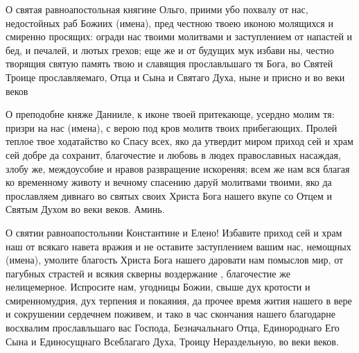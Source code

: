 \bigskip\bigskip\mychapterending

 


О святая равноапостольная княгине Ольго, приими убо похвалу от нас, недостойных раб Божиих (имена), пред  честною твоею иконою молящихся и смиренно просящих: огради нас твоими молитвами и заступлением от напастей и бед,  и печалей, и лютых грехов; еще же и от будущих мук избави ны, честно творящия святую память твою и славящия прославльшаго тя Бога, во Святей Троице прославляемаго, Отца и Сына и Святаго Духа, ныне и присно и во веки веков


\bigskip\bigskip\mychapterending

 


О преподобне княже Данииле, к иконе твоей притекающе, усердно молим тя: призри на нас (имена), с верою под  кров молитв твоих прибегающих.  Пролей теплое твое ходатайство ко Спасу всех,  яко да утвердит миром приход сей и храм сей добре да сохранит, благочестие и любовь в людех православных насаждая, злобу же, междоусобие и нравов развращение  искореняя; всем же нам вся благая ко временному животу и вечному спасению даруй молитвами твоими, яко да прославляем дивнаго во святых своих Христа Бога нашего вкупе со Отцем и Святым Духом во веки веков. Аминь.


\bigskip\bigskip\mychapterending

 


О святии равноапостольнии Константине и Елено! Избавите приход сей и храм наш от всякаго навета вражия и не оставите заступлением вашим нас, немощных (имена), умолите благость Христа Бога нашего даровати нам помыслов мир, от пагубных страстей и всякия скверны воздержание , благочестие же нелицемерное.  Испросите нам, угодницы Божии, свыше дух кротости и смиренномудрия, дух терпения и покаяния,  да прочее время жития нашего в вере и сокрушении сердечнем поживем, и тако в час скончания нашего благодарне восхвалим прославльшаго вас Господа, Безначальнаго Отца, Единороднаго Его Сына и Единосущнаго Всеблагаго Духа, Троицу Нераздельную, во веки веков.


